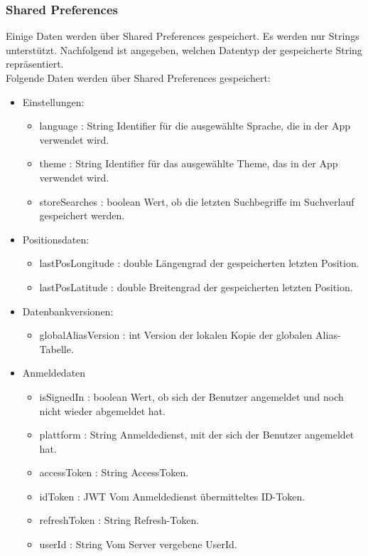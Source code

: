 \subsubsection{Shared Preferences}
Einige Daten werden über Shared Preferences gespeichert. Es werden nur Strings unterstützt. 
Nachfolgend ist angegeben, welchen Datentyp der gespeicherte String repräsentiert.\\
Folgende Daten werden über Shared Preferences gespeichert:

\begin{itemize}
    \item Einstellungen: 
    \begin{itemize}
        \item language : String Identifier für die ausgewählte Sprache, die in der App verwendet wird.
        \item theme : String Identifier für das ausgewählte Theme, das in der App verwendet wird.
        \item storeSearches : boolean Wert, ob die letzten Suchbegriffe im Suchverlauf gespeichert werden.
    \end{itemize}
    \item Positionsdaten:
    \begin{itemize}
        \item lastPosLongitude : double Längengrad der gespeicherten letzten Position.
        \item lastPosLatitude : double Breitengrad der gespeicherten letzten Position.
    \end{itemize}
    \item Datenbankversionen:
    \begin{itemize}
        \item globalAliasVersion : int Version der lokalen Kopie der globalen Alias-Tabelle.
    \end{itemize}
    \item Anmeldedaten
    \begin{itemize}
        \item isSignedIn : boolean Wert, ob sich der Benutzer angemeldet und noch nicht wieder abgemeldet hat.
        \item plattform : String Anmeldedienst, mit der sich der Benutzer angemeldet hat.
        \item accessToken : String AccessToken.
        \item idToken : JWT Vom Anmeldedienst übermitteltes ID-Token.
        \item refreshToken : String Refresh-Token.
        \item userId : String Vom Server vergebene UserId.
    \end{itemize}
\end{itemize}
